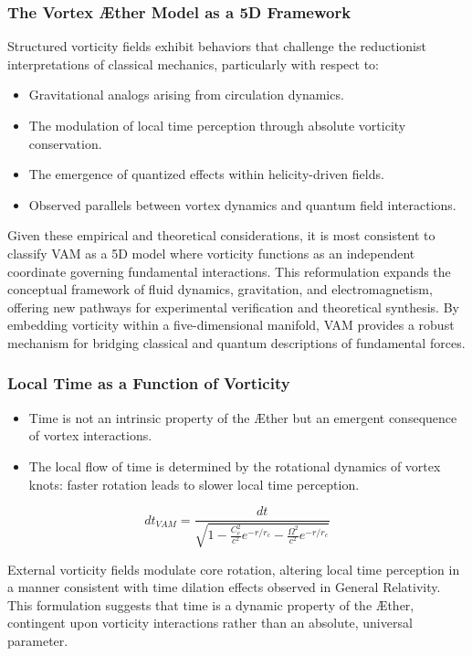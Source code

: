 \subsubsection*{The Vortex Æther Model as a 5D Framework}
Structured vorticity fields exhibit behaviors that challenge the reductionist interpretations of classical mechanics, particularly with respect to:

\begin{itemize}
    \item Gravitational analogs arising from circulation dynamics.
    \item The modulation of local time perception through absolute vorticity conservation.
    \item The emergence of quantized effects within helicity-driven fields.
    \item Observed parallels between vortex dynamics and quantum field interactions.
\end{itemize}

Given these empirical and theoretical considerations, it is most consistent to classify VAM as a 5D model where vorticity functions as an independent coordinate governing fundamental interactions.
This reformulation expands the conceptual framework of fluid dynamics, gravitation, and electromagnetism, offering new pathways for experimental verification and theoretical synthesis.
By embedding vorticity within a five-dimensional manifold, VAM provides a robust mechanism for bridging classical and quantum descriptions of fundamental forces.


\subsubsection*{Local Time as a Function of Vorticity}\label{subsubsec:local-time-as-a-function-of-vorticity}

\begin{itemize}
    \item Time is not an intrinsic property of the Æther but an emergent consequence of vortex interactions.
    \item The local flow of time is determined by the rotational dynamics of vortex knots: faster rotation leads to slower local time perception.
\end{itemize}

\[dt_{VAM} = \frac{dt}{\sqrt{1 - \frac{C_e^2}{c^2} e^{-r/r_c} - \frac{\Omega^2}{c^2} e^{-r/r_c}}}\]

External vorticity fields modulate core rotation, altering local time perception in a manner consistent with time dilation effects observed in General Relativity.
This formulation suggests that time is a dynamic property of the Æther, contingent upon vorticity interactions rather than an absolute, universal parameter.

